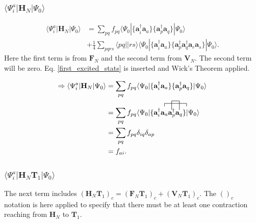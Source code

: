 \documentclass[a4paper,norsk,11pt,twoside]{report}
\begin{document}
\subsubsection{$\langle \Psi_i^a | \textbf{H}_N | \Psi_0 \rangle$}

\begin{align}
\langle \Psi_i^a | \textbf{H}_N | \Psi_0 \rangle & = 
\sum_{pq} f_{pq} \langle \Psi_0| \{ \textbf{a}^{\dag}_i \textbf{a}_a \} \{ \textbf{a}^{\dag}_p \textbf{a}_q \} | \Psi_0 \rangle \nonumber \\ &
+ \frac{1}{4} \sum_{pqrs} \langle pq||rs \rangle  \langle \Psi_0| \{ \textbf{a}^{\dag}_i \textbf{a}_a \} \{ \textbf{a}^{\dag}_p \textbf{a}^{\dag}_q \textbf{a}_r \textbf{a}_s \} | \Psi_0 \rangle .
\end{align}
Here the first term is from $\textbf{F}_N$ and the second term from $\textbf{V}_N$. The second term will be zero. Eq. \eqref{first_excited_stats} is inserted and Wick's Theorem applied.

\begin{align}
\Rightarrow \langle \Psi_i^a | \textbf{H}_N | \Psi_0 \rangle & = \sum_{pq} f_{pq} \langle \Psi_0| \{ \textbf{a}^{\dag}_i \textbf{a}_a \} \{ \textbf{a}^{\dag}_p \textbf{a}_q \} | \Psi_0 \rangle \nonumber \\ &
= \sum_{pq} f_{pq} \langle \Psi_0| \{
\contraction{}{\textbf{a}^{\dag}_i}{\textbf{a}_a \textbf{a}^{\dag}_p}{\textbf{a}_q}
\contraction[3ex]{\textbf{a}^{\dag}_i}{\textbf{a}_a}{}{\textbf{a}^{\dag}_p}
\textbf{a}^{\dag}_i \textbf{a}_a \textbf{a}^{\dag}_p \textbf{a}_q 
 \} | \Psi_0 \rangle \nonumber \\ &
= \sum_{pq} f_{pq} \delta_{iq} \delta_{ap} \nonumber \\ &
= f_{ai} . \label{t1amp_1}
\end{align}

\subsubsection{$\langle \Psi_i^a | \textbf{H}_N \textbf{T}_1 | \Psi_0 \rangle$}

The next term includes $(\textbf{H}_N \textbf{T}_1)_c = (\textbf{F}_N \textbf{T}_1)_c + (\textbf{V}_N \textbf{T}_1)_c$. The $()_c$ notation is here applied to specify that there must be at least one contraction reaching from $\textbf{H}_N$ to $\textbf{T}_1$.
\end{document}
